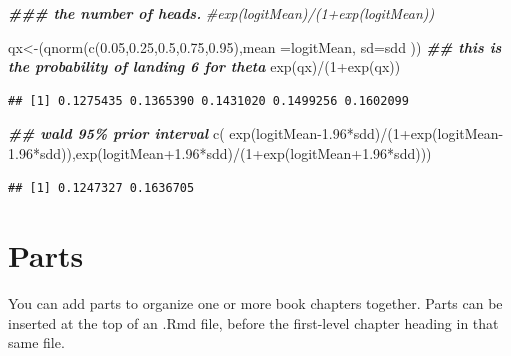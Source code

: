 \documentclass[
]{book}
\newenvironment{Shaded}{\begin{snugshade}}{\end{snugshade}}
\newcommand{\AttributeTok}[1]{\textcolor[rgb]{0.77,0.63,0.00}{#1}}
\newcommand{\CommentTok}[1]{\textcolor[rgb]{0.56,0.35,0.01}{\textit{#1}}}
\newcommand{\DecValTok}[1]{\textcolor[rgb]{0.00,0.00,0.81}{#1}}
\newcommand{\DocumentationTok}[1]{\textcolor[rgb]{0.56,0.35,0.01}{\textbf{\textit{#1}}}}
\newcommand{\FloatTok}[1]{\textcolor[rgb]{0.00,0.00,0.81}{#1}}
\newcommand{\FunctionTok}[1]{\textcolor[rgb]{0.00,0.00,0.00}{#1}}
\newcommand{\NormalTok}[1]{#1}
\newcommand{\OtherTok}[1]{\textcolor[rgb]{0.56,0.35,0.01}{#1}}
\newcommand{\SpecialCharTok}[1]{\textcolor[rgb]{0.00,0.00,0.00}{#1}}
\theoremstyle{definition}
\theoremstyle{definition}
\theoremstyle{definition}
\theoremstyle{definition}
\theoremstyle{remark}
\begin{document}
\begin{Shaded}
\begin{Highlighting}[]
    \DocumentationTok{\#\#\# the number of heads.    }
  \CommentTok{\#exp(logitMean)/(1+exp(logitMean))}

\NormalTok{ qx}\OtherTok{\textless{}{-}}\NormalTok{(}\FunctionTok{qnorm}\NormalTok{(}\FunctionTok{c}\NormalTok{(}\FloatTok{0.05}\NormalTok{,}\FloatTok{0.25}\NormalTok{,}\FloatTok{0.5}\NormalTok{,}\FloatTok{0.75}\NormalTok{,}\FloatTok{0.95}\NormalTok{),}\AttributeTok{mean =}\NormalTok{logitMean, }\AttributeTok{sd=}\NormalTok{sdd ))}
 \DocumentationTok{\#\# this is the probability of landing 6 for theta}
 \FunctionTok{exp}\NormalTok{(qx)}\SpecialCharTok{/}\NormalTok{(}\DecValTok{1}\SpecialCharTok{+}\FunctionTok{exp}\NormalTok{(qx))}
\end{Highlighting}
\end{Shaded}

\begin{verbatim}
## [1] 0.1275435 0.1365390 0.1431020 0.1499256 0.1602099
\end{verbatim}

\begin{Shaded}
\begin{Highlighting}[]
\DocumentationTok{\#\# wald 95\% prior interval}
\FunctionTok{c}\NormalTok{( }\FunctionTok{exp}\NormalTok{(logitMean}\FloatTok{{-}1.96}\SpecialCharTok{*}\NormalTok{sdd)}\SpecialCharTok{/}\NormalTok{(}\DecValTok{1}\SpecialCharTok{+}\FunctionTok{exp}\NormalTok{(logitMean}\FloatTok{{-}1.96}\SpecialCharTok{*}\NormalTok{sdd)),}\FunctionTok{exp}\NormalTok{(logitMean}\FloatTok{+1.96}\SpecialCharTok{*}\NormalTok{sdd)}\SpecialCharTok{/}\NormalTok{(}\DecValTok{1}\SpecialCharTok{+}\FunctionTok{exp}\NormalTok{(logitMean}\FloatTok{+1.96}\SpecialCharTok{*}\NormalTok{sdd)))}
\end{Highlighting}
\end{Shaded}

\begin{verbatim}
## [1] 0.1247327 0.1636705
\end{verbatim}

\hypertarget{parts}{%
\chapter{Parts}\label{parts}}

You can add parts to organize one or more book chapters together. Parts can be inserted at the top of an .Rmd file, before the first-level chapter heading in that same file.
\end{document}
